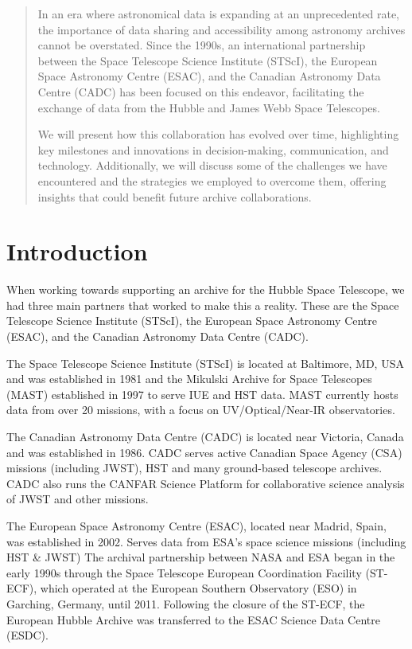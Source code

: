 \documentclass[11pt,twoside]{article}
\begin{document}


\begin{abstract}
In an era where astronomical data is expanding at an unprecedented rate, the importance of data sharing and accessibility among astronomy archives cannot be overstated. 
Since the 1990s, an international partnership between the Space Telescope Science Institute (STScI), the European Space Astronomy Centre (ESAC), 
and the Canadian Astronomy Data Centre (CADC) has been focused on this endeavor, facilitating the exchange of data from the Hubble and James Webb Space Telescopes.

We will present how this collaboration has evolved over time, highlighting key milestones and innovations in decision-making, communication, and technology. 
Additionally, we will discuss some of the challenges we have encountered and the strategies we employed to overcome them, offering insights that could benefit future archive collaborations.
\end{abstract}

\section{Introduction}

When working towards supporting an archive for the Hubble Space Telescope, we had three main partners that worked to make this a reality.
These are the Space Telescope Science Institute (STScI), the European Space Astronomy Centre (ESAC), and the Canadian Astronomy Data Centre (CADC).

The Space Telescope Science Institute (STScI) is located at Baltimore, MD, USA and was established in 1981 and the Mikulski Archive for Space Telescopes (MAST) established in 1997 to serve IUE and HST data. MAST currently hosts data from over 20 missions, with a focus on UV/Optical/Near-IR observatories.

The Canadian Astronomy Data Centre (CADC) is located near Victoria, Canada and was established in 1986.
CADC serves active Canadian Space Agency (CSA) missions (including JWST), HST and many ground-based telescope archives.
CADC also runs the CANFAR Science Platform for collaborative science analysis of JWST and other missions.

The European Space Astronomy Centre (ESAC), located near Madrid, Spain, was established in 2002. Serves data from ESA's space science missions (including HST \& JWST) The archival partnership between NASA and ESA began in the early 1990s through the Space Telescope European Coordination Facility (ST-ECF), which operated at the European Southern Observatory (ESO) in Garching, Germany, until 2011. Following the closure of the ST-ECF, the European Hubble Archive was transferred to the ESAC Science Data Centre (ESDC).
\end{document}
